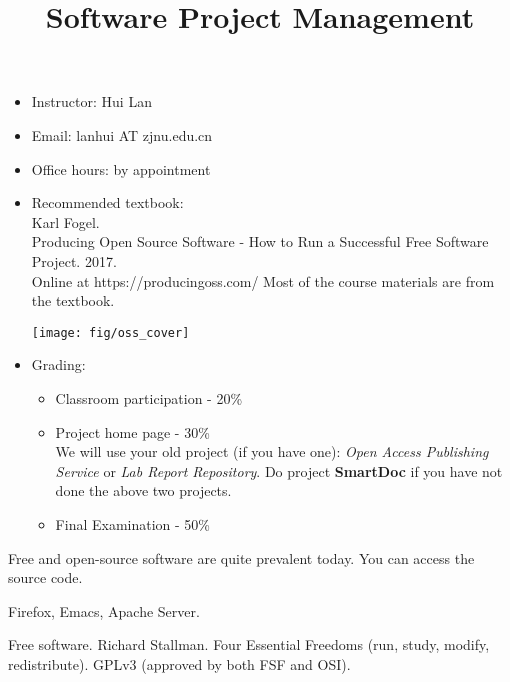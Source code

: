 \documentclass[landscape,30pt]{foils}
\title{Software Project Management}
\author{}
\date{}
\begin{document}
\maketitle


\begin{itemize}
\item Instructor: Hui Lan

\item Email: lanhui AT zjnu.edu.cn

\item Office hours: by appointment

\item Recommended textbook: \\Karl Fogel.  \\
  Producing Open Source Software - How to Run a Successful Free Software Project.  2017. \\
  Online at https://producingoss.com/   Most of the course materials are from the textbook.

  \begin{center}
    \texttt{[image: fig/oss\_cover]}
  \end{center}
  
\item  Grading:
  \begin{itemize}
  \item Classroom participation - 20\%
  \item Project home page - 30\% \\
    {\small We will use your old project (if you have one): {\em Open Access Publishing Service} or {\em  Lab Report Repository}.  Do project {\bf SmartDoc} if you have not done the above two projects. }
  \item Final Examination - 50\%
  \end{itemize}


\end{itemize}



Free and open-source software are quite prevalent today.  You can access the source code.

Firefox, Emacs, Apache Server.

Free software.  Richard Stallman.  Four Essential Freedoms (run, study, modify, redistribute).  GPLv3  (approved by both FSF and OSI).
\end{document}

